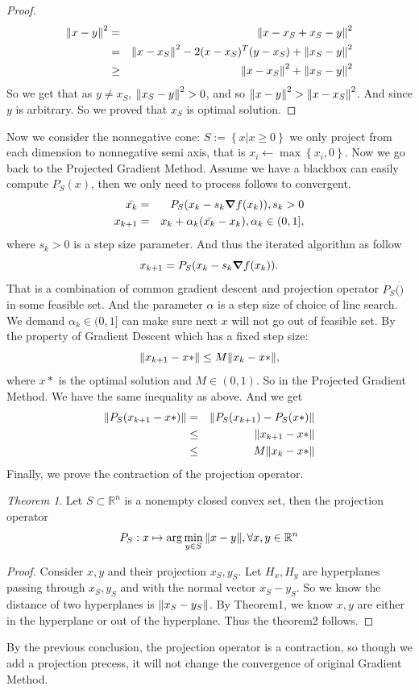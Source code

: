 \documentclass[12pt]{article}
\theoremstyle{remark}
\newtheorem{theorem}{Theorem}
\def\bR{\mathbb R}
\begin{document}
\begin{CJK}{UTF8}{bsmi}
\begin{proof}
\begin{eqnarray*}
\norm{x-y}^2 &=& \norm{ x-x_S +x_S -y }^2\\
 &=& \norm{x-x_S}^2 -2 (x-x_S)^T(y-x_S)+ \norm{x_S-y}^2\\
 &\geq& \norm{ x-x_S  }^2 + \norm{x_S-y}^2
\end{eqnarray*}
So we get that as $y\neq x_S$, $\norm{x_S-y}^2>0$, and so $\norm{x-y}^2 > \norm{x-x_S}^2$. And since $y$ is arbitrary. So we proved that $x_S$ is optimal solution.
\end{proof}
Now we consider the nonnegative cone: $ S := \left\{ x | x\geq0 \right\}$ we only project from each dimension to nonnegative semi axis, that is $x_i \leftarrow \max{\left\{ x_i,0 \right\}}$. Now we go back to the Projected Gradient Method. Assume we have a blackbox can easily compute $P_S(x)$, then we only need to process follows to convergent.
\begin{eqnarray*}
\bar{x_k} &=& P_S(x_k-s_k\grad f(x_k)),s_k>0\\
x_{k+1}   &=& x_k + \alpha_k(\bar{x_k}-x_k),\alpha_k \in ( 0,1],
\end{eqnarray*}
where $s_k>0$ is a step size parameter. And thus the iterated algorithm as follow
$$
x_{k+1} = P_S(x_k-s_k \grad f(x_k)   ). 
$$
That is a combination of common gradient descent and projection operator $P_S(\dot)$ in some feasible set. And the parameter $\alpha$ is a step size of choice of line search. We demand $\alpha_k \in ( 0,1]$ can make sure next $x$ will not go out of feasible set. By the property of Gradient Descent which has a fixed step size:
$$
\norm{ x_{k+1}-x*} \leq M \norm{x_k -x* },
$$ 
where $x*$ is the optimal solution and $M \in (0,1) $.  
So in the Projected Gradient Method. We have the same inequality as above. And we get
\begin{eqnarray*}
\norm{P_S(x_{k+1}-x*)} &=& \norm{ P_S(x_{k+1})-P_S(x*) } \\
 &\leq& \norm{ x_{k+1} - x* }\\
 &\leq& M \norm{x_k-x*}
\end{eqnarray*}
Finally, we prove the contraction of the projection operator.
\begin{theorem}
Let $S\subset \bR^n$ is a nonempty closed convex set, then the projection operator
$$
P_S:x \mapsto \arg \min_{y \in S}  \norm{x-y}, \forall x,y\in \bR^n
$$
\end{theorem}
\begin{proof}
Consider $x,y$ and their projection $x_S,y_S$. Let $H_x,H_y$ are hyperplanes passing through $x_S,y_S$ and with the normal vector $x_S-y_S$. So we know the distance of two hyperplanes is $\norm{x_S-y_S}$. By Theorem1, we know $x,y$ are either in the hyperplane or out of the hyperplane. Thus the theorem2 follows.
\end{proof}
By the previous conclusion, the projection operator is a contraction, so though we add a projection precess, it will not change the convergence of original Gradient Method.


\end{CJK}
\end{document}
